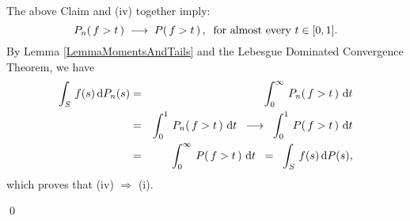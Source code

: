\vskip 0.3cm
\noindent
The above Claim and (iv) together imply:
\begin{equation*}
P_{n}\!\left(\,f > t\,\right) \;\longrightarrow\; P\!\left(\,f > t\,\right),
\;\;\textnormal{for almost every $t \in [0,1]$}.
\end{equation*}
By Lemma \ref{LemmaMomentsAndTails} and the Lebesgue Dominated Convergence Theorem, we have
\begin{eqnarray*}
\int_{S}\,f(s)\,\textnormal{d} P_{n}(s) &=& \int_{0}^{\infty}\,P_{n}\!\left(\,f > t\,\right)\,\textnormal{d} t
\\
&=& \int_{0}^{1}\,P_{n}\!\left(\,f > t\,\right)\,\textnormal{d} t \;\;\longrightarrow\;\; \int_{0}^{1}\,P\!\left(\,f > t\,\right)\,\textnormal{d} t
\\
&=& \int_{0}^{\infty}\,P\!\left(\,f > t\,\right)\,\textnormal{d} t
\;\;=\;\; \int_{S}\,f(s)\,\textnormal{d} P(s),
\end{eqnarray*}
which proves that (iv) $\Longrightarrow$ (i).

\qed

